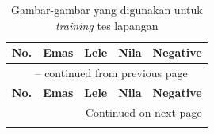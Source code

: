   \begin{longtable}{|c|c|c|c|c|}
    \caption{Gambar-gambar yang digunakan untuk \textit{training} tes lapangan} \label{tab: Training set} \\
    \hline
    \textbf{No.} & \textbf{Emas} & \textbf{Lele} & \textbf{Nila} & \textbf{Negative} \\
    \hline
    \endfirsthead
    \multicolumn{5}{c}{{\tablename\ \thetable{} -- continued from previous page}} \\
    \hline
    \textbf{No.} & \textbf{Emas} & \textbf{Lele} & \textbf{Nila} & \textbf{Negative} \\
    \hline
    \endhead
    \hline \multicolumn{5}{|r|}{{Continued on next page}} \\ \hline
    \endfoot
    \hline
    \endlastfoot


\end{longtable}
